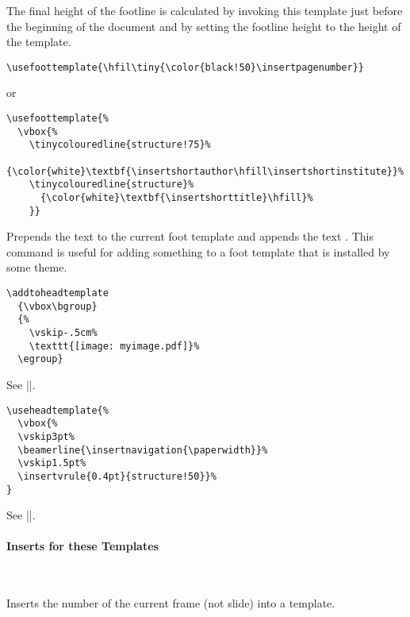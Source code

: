 \begin{command}{\usefoottemplate{}}
  The final height of the footline is calculated by invoking this
  template just before the beginning of the document and by setting
  the footline height to the height of the template.
  \example
\begin{verbatim}
\usefoottemplate{\hfil\tiny{\color{black!50}\insertpagenumber}}
\end{verbatim}
or
\begin{verbatim}
\usefoottemplate{%
  \vbox{%
    \tinycolouredline{structure!75}%
      {\color{white}\textbf{\insertshortauthor\hfill\insertshortinstitute}}%
    \tinycolouredline{structure}%
      {\color{white}\textbf{\insertshorttitle}\hfill}%
    }}
\end{verbatim}
\end{command}

\begin{command}{\addtofoottemplate{}}
  Prepends the text  to the current foot template and
  appends the text . This command is useful for adding
  something to a foot template that is installed by some theme.
  \example
\begin{verbatim}
\addtoheadtemplate
  {\vbox\bgroup}
  {%
    \vskip-.5cm%
    \texttt{[image: myimage.pdf]}%
  \egroup}
\end{verbatim}
\end{command}


\begin{command}{\useheadtemplate{}}
  See |\usefoottemplate|.
  \example
\begin{verbatim}
\useheadtemplate{%
  \vbox{%
  \vskip3pt%
  \beamerline{\insertnavigation{\paperwidth}}%
  \vskip1.5pt%
  \insertvrule{0.4pt}{structure!50}}%
}
\end{verbatim}
\end{command}

\begin{command}{\addtoheadtemplate{}}
  See |\addtofoottemplate|.
\end{command}


\paragraph{Inserts for these Templates}\ 

\begin{command}{\insertframenumber}
  Inserts the number of the current frame (not slide) into a template.
\end{command}

